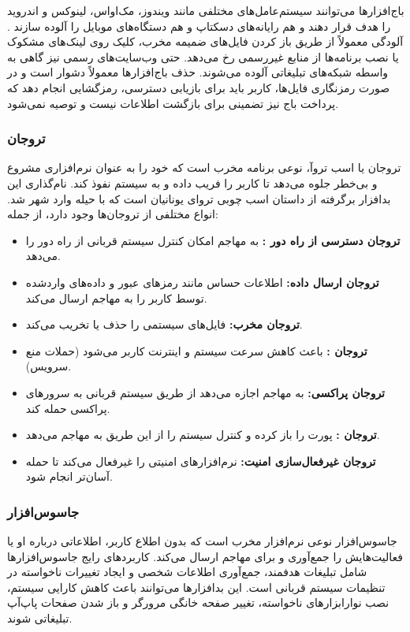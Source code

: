 باج‌افزارها می‌توانند سیستم‌عامل‌های مختلفی مانند ویندوز، مک‌اواس، لینوکس و اندروید را هدف قرار دهند و هم رایانه‌های دسکتاپ و هم دستگاه‌های موبایل را آلوده سازند \cite{AndroidSecurity}. آلودگی معمولاً از طریق باز کردن فایل‌های ضمیمه مخرب، کلیک روی لینک‌های مشکوک یا نصب برنامه‌ها از منابع غیررسمی رخ می‌دهد. حتی وب‌سایت‌های رسمی نیز گاهی به واسطه شبکه‌های تبلیغاتی آلوده می‌شوند. حذف باج‌افزارها معمولاً دشوار است و در صورت رمزنگاری فایل‌ها، کاربر باید برای بازیابی دسترسی، رمزگشایی انجام دهد که پرداخت باج نیز تضمینی برای بازگشت اطلاعات نیست و توصیه نمی‌شود.

\subsubsection{تروجان}
تروجان یا اسب تروآ، نوعی برنامه مخرب است که خود را به عنوان نرم‌افزاری مشروع و بی‌خطر جلوه می‌دهد تا کاربر را فریب داده و به سیستم نفوذ کند. نام‌گذاری این بدافزار برگرفته از داستان اسب چوبی تروای یونانیان است که با حیله وارد شهر شد. انواع مختلفی از تروجان‌ها وجود دارد، از جمله:
\begin{itemize}
    \renewcommand{\labelitemi}{\lr{$\bullet$}}
    \item \textbf{تروجان دسترسی از راه دور :} به مهاجم امکان کنترل سیستم قربانی از راه دور را می‌دهد.
    \item \textbf{تروجان ارسال داده:} اطلاعات حساس مانند رمزهای عبور و داده‌های واردشده توسط کاربر را به مهاجم ارسال می‌کند.
    \item \textbf{تروجان مخرب:} فایل‌های سیستمی را حذف یا تخریب می‌کند.
    \item \textbf{تروجان :} باعث کاهش سرعت سیستم و اینترنت کاربر می‌شود (حملات منع سرویس).
    \item \textbf{تروجان پراکسی:} به مهاجم اجازه می‌دهد از طریق سیستم قربانی به سرورهای پراکسی حمله کند.
    \item \textbf{تروجان :} پورت  را باز کرده و کنترل سیستم را از این طریق به مهاجم می‌دهد.
    \item \textbf{تروجان غیرفعال‌سازی امنیت:} نرم‌افزارهای امنیتی را غیرفعال می‌کند تا حمله آسان‌تر انجام شود.
\end{itemize}

\subsubsection{جاسوس‌افزار}
جاسوس‌افزار نوعی نرم‌افزار مخرب است که بدون اطلاع کاربر، اطلاعاتی درباره او یا فعالیت‌هایش را جمع‌آوری و برای مهاجم ارسال می‌کند. کاربردهای رایج جاسوس‌افزارها شامل تبلیغات هدفمند، جمع‌آوری اطلاعات شخصی و ایجاد تغییرات ناخواسته در تنظیمات سیستم قربانی است. این بدافزارها می‌توانند باعث کاهش کارایی سیستم، نصب نوارابزارهای ناخواسته، تغییر صفحه خانگی مرورگر و باز شدن صفحات پاپ‌آپ تبلیغاتی شوند.

